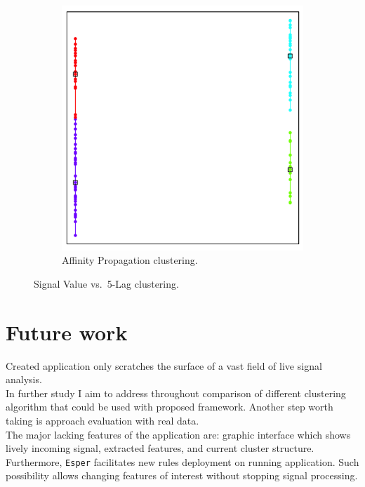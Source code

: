 \documentclass[11pt, letterpaper]{article}            %
\begin{document}
\begin{figure}[htbp]
\begin{subfigure}[b]{0.32\textwidth}
    \includegraphics[height=\textwidth]{./gfx/ap35.png}
    \caption{Affinity Propagation clustering.\label{fig:svlag:ap}}
  \end{subfigure}

  \caption{Signal Value vs.\ 5-Lag clustering.\label{fig:svlag}}
\end{figure}

\section{Future work}
Created application only scratches the surface of a vast field of live signal analysis.\\
In further study I aim to address throughout comparison of different clustering algorithm that could be used with proposed framework. Another step worth taking is approach evaluation with real data.\\

The major lacking features of the application are: graphic interface which shows lively incoming signal, extracted features, and current cluster structure.\\
Furthermore, \texttt{Esper} facilitates new rules deployment on running application. Such possibility allows changing features of interest without stopping signal processing.\\
\end{document}

